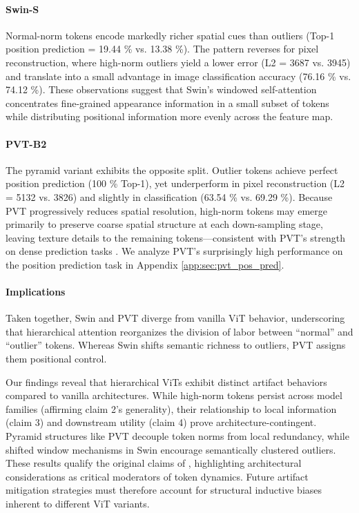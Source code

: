 \documentclass[10pt]{article} \usepackage[preprint]{tmlr}
\begin{document}
\paragraph{Swin-S} Normal-norm tokens encode markedly richer spatial cues than outliers (Top-1 position prediction = 19.44 \% vs. 13.38 \%). The pattern reverses for pixel reconstruction, where high-norm outliers yield a lower error (L2 = 3687 vs. 3945) and translate into a small advantage in image classification accuracy (76.16 \% vs. 74.12 \%). These observations suggest that Swin’s windowed self-attention concentrates fine-grained appearance information in a small subset of tokens while distributing positional information more evenly across the feature map.
\paragraph{PVT-B2} The pyramid variant exhibits the opposite split. Outlier tokens achieve perfect position prediction (100 \% Top-1), yet underperform in pixel reconstruction (L2 = 5132 vs. 3826) and slightly in classification (63.54 \% vs. 69.29 \%). Because PVT progressively reduces spatial resolution, high-norm tokens may emerge primarily to preserve coarse spatial structure at each down-sampling stage, leaving texture details to the remaining tokens—consistent with PVT’s strength on dense prediction tasks \citep{wang2022pvt}. We analyze PVT's surprisingly high performance on the position prediction task in Appendix \ref{app:sec:pvt_pos_pred}. 
\paragraph{Implications} Taken together, Swin and PVT diverge from vanilla ViT behavior, underscoring that hierarchical attention reorganizes the division of labor between “normal” and “outlier” tokens. Whereas Swin shifts semantic richness to outliers, PVT assigns them positional control. 

Our findings reveal that hierarchical ViTs exhibit distinct artifact behaviors compared to vanilla architectures. While high-norm tokens persist across model families (affirming claim 2’s generality), their relationship to local information (claim 3) and downstream utility (claim 4) prove architecture-contingent. Pyramid structures like PVT decouple token norms from local redundancy, while shifted window mechanisms in Swin encourage semantically clustered outliers. These results qualify the original claims of \citet{darcet2024registers}, highlighting architectural considerations as critical moderators of token dynamics. Future artifact mitigation strategies must therefore account for structural inductive biases inherent to different ViT variants.
\end{document}
